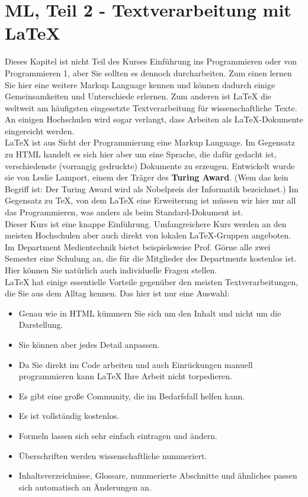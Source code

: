 \chapter{ML, Teil 2 - Textverarbeitung mit LaTeX}

Dieses Kapitel ist nicht Teil des Kurses \glqq{}Einführung ins Programmieren\grqq{} oder von \glqq{}Programmieren 1\grqq{}, aber Sie sollten es dennoch durcharbeiten. Zum einen lernen Sie hier eine weitere Markup Language kennen und können dadurch einige Gemeinsamkeiten und Unterschiede erlernen. Zum anderen ist LaTeX die weltweit am häufigsten eingesetzte Textverarbeitung für wissenschaftliche Texte. An einigen Hochschulen wird sogar verlangt, dass Arbeiten als LaTeX-Dokumente eingereicht werden.\\

LaTeX ist aus Sicht der Programmierung eine Markup Language. Im Gegensatz zu HTML handelt es sich hier aber um eine Sprache, die dafür gedacht ist, verschiedenste (vorrangig gedruckte) Dokumente zu erzeugen. Entwickelt wurde sie von Leslie Lamport, einem der Träger des \textbf{Turing Award}. (Wem das kein Begriff ist: Der Turing Award wird als Nobelpreis der Informatik bezeichnet.) Im Gegensatz zu TeX, von dem LaTeX eine Erweiterung ist müssen wir hier nur all das Programmieren, was anders als beim Standard-Dokument ist.\\

Dieser Kurs ist eine knappe Einführung. Umfangreichere Kurs werden an den meisten Hochschulen aber auch direkt von lokalen LaTeX-Gruppen angeboten. Im Department Medientechnik bietet beispielsweise Prof. Görne alle zwei Semester eine Schulung an, die für die Mitglieder des Departments kostenlos ist. Hier können Sie natürlich auch individuelle Fragen stellen.\\

LaTeX hat einige essentielle Vorteile gegenüber den meisten Textverarbeitungen, die Sie aus dem Alltag kennen. Das hier ist nur eine Auswahl:

\begin{itemize}
	\item Genau wie in HTML kümmern Sie sich um den Inhalt und nicht um die Darstellung.
	\item Sie können aber jedes Detail anpassen.
	\item Da Sie direkt im Code arbeiten und auch Einrückungen manuell programmieren kann LaTeX Ihre Arbeit nicht torpedieren.
	\item Es gibt eine große Community, die im Bedarfsfall helfen kann.
	\item Es ist vollständig kostenlos.
	\item Formeln lassen sich sehr einfach eintragen und ändern.
	\item Überschriften werden wissenschaftliche nummeriert.
	\item Inhaltsverzeichnisse, Glossare, nummerierte Abschnitte und ähnliches passen sich automatisch an Änderungen an.
\end{itemize}

